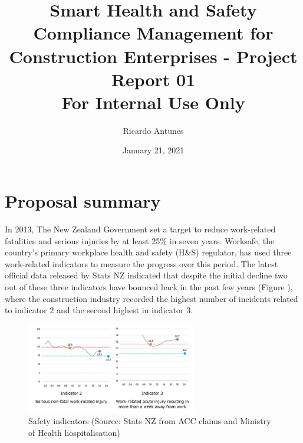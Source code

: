 \documentclass{article}
\author{Ricardo Antunes}
\date{January 21, 2021}
\title{Smart Health and Safety Compliance Management for Construction Enterprises - Project Report 01\\\medskip
\large For Internal Use Only}
\begin{document}
\maketitle
\tableofcontents



\section{Proposal summary}
\label{sec:org580e832}

In 2013, The New Zealand Government set a target to reduce work-related fatalities and serious injuries by at least 25\% in seven years. 
Worksafe, the country's primary workplace health and safety (H\&S) regulator, has used three work-related indicators to measure the progress over this period. 
The latest official data released by Stats NZ indicated that despite the initial decline two out of these three indicators have bounced back in the past few years (Figure \label{org1a0a054}), where the construction industry recorded the highest number of incidents related to indicator 2 and the second highest in indicator 3.  

\begin{figure}[htbp]
\centering
\includegraphics[height=150]{./Images/fig_01.png}
\caption{\label{fig:org7a7b3b1}Safety indicators (Source: Stats NZ from ACC claims and Ministry of Health hospitalisation)}
\end{figure}
\end{document}
